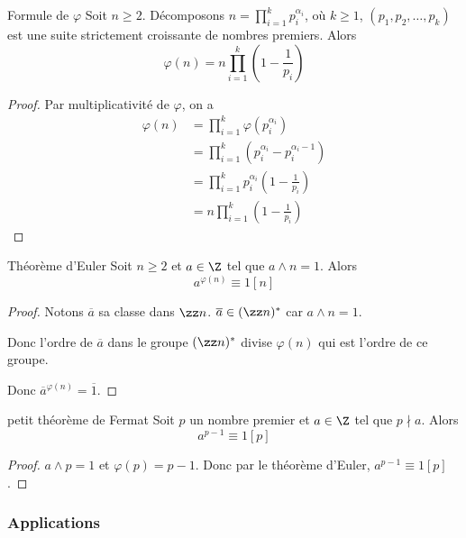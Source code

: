 \begin{theoreme}{Formule de $\varphi$}{}
    Soit $n \geqslant 2$. Décomposons $\displaystyle n = \prod_{i = 1}^k p_i^{\alpha_i}$, où 
    $k \geqslant 1$, $(p_1, p_2, \ldots, p_k)$ est une suite strictement croissante de nombres premiers. 
    Alors $$\varphi(n) = n \prod_{i = 1}^k \left(1 - \frac 1 {p_i}\right)$$
\end{theoreme}

\begin{proof}
    Par multiplicativité de $\varphi$, on a
    \begin{align*}
        \varphi(n) & = \prod_{i = 1}^k \varphi(p_i^{\alpha_i}) \\
        & = \prod_{i = 1}^k \left(p_i^{\alpha_i} - p_i^{\alpha_i - 1}\right) \\
        & = \prod_{i = 1}^k p_i^{\alpha_i} \left( 1 - \frac 1 {p_i} \right) \\
        & = n \prod_{i = 1}^k \left(1 - \frac 1 {p_i}\right)
    \end{align*}
\end{proof}

\begin{theoreme}{Théorème d'Euler}{}
    Soit $n \geqslant 2$ et $a \in \Z$ tel que $a \wedge n = 1$.
    Alors $$a^{\varphi(n)} \equiv 1 [n]$$
\end{theoreme}

\begin{proof}
    Notons $\overline a $ sa classe dans $\zz n$. $\overline a \in (\zz n)^*$ car 
    $a \wedge n = 1$.

    Donc l'ordre de $\overline a$ dans le groupe $(\zz n)^*$ divise $\varphi(n)$ qui 
    est l'ordre de ce groupe.

    Donc $\overline a^{\varphi(n)} = \overline 1$.
\end{proof}

\begin{corollaire}{petit théorème de Fermat}{}
    Soit $p$ un nombre premier et $a \in \Z$ tel que $p \nmid a$.
    Alors $$a^{p - 1} \equiv 1 [p]$$
\end{corollaire}

\begin{proof}
    $a \wedge p = 1$ et $\varphi(p) = p - 1$.
    Donc par le théorème d'Euler, $a^{p - 1} \equiv 1 [p]$.
\end{proof}

\subsubsection{Applications }

